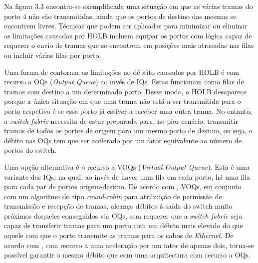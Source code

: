 Na figura 3.3 encontra-se exemplificada uma situação em que as várias tramas do porto 4 não são transmitidas, ainda que os portos de destino das mesmas se encontrem livres. Técnicas que podem ser aplicadas para minimizar ou eliminar as limitações causadas por HOLB incluem equipar os portos com lógica capaz de requerer o envio de tramas que se encontrem em posições mais atrasadas nas filas ou incluir várias filas por porto. \par
Uma forma de contornar as limitações no débtito causados por HOLB é com recurso a OQs (\textit{Output Queue}) ao invés de IQs. Estas funcionam como filas de tramas com destino a um determinado porto. Desse modo, o HOLB desaparece porque a única situação em que uma trama não está a ser transmitida para o porto respetivo é se esse porto já estiver a receber uma outra trama. No entanto, a \textit{switch fabric} necessita de estar preparada para, no pior cenário, transmitir tramas de todos os portos de origem para um mesmo porto de destino, ou seja, o débito nas OQs tem que ser acelerado por um fator equivalente ao número de portos do switch.\par 
Uma opção alternativa é o recurso a VOQs (\textit{Virtual Output Queue}). Esta é uma variante das IQs, na qual, ao invés de haver uma fila em cada porto, há uma fila para cada par de portos origem-destino. De acordo com \cite{VOQ}, VOQs, em conjunto com um algoritmo do tipo \textit{round-robin} para atribuição de permissão de transmissão e recepção de tramas, alcança débitos à saída do switch muito próximos daqueles conseguidos via OQs, sem requerer que a \textit{switch fabric} seja capaz de transferir tramas para um porto com um débito mais elevado do que aquele com que o porto transmite as tramas para os cabos de \textit{Ethernet}. De acordo com \cite{math}, com recurso a uma aceleração por um fator de apenas dois, torna-se possível garantir o mesmo débito que com uma arquitectura com recurso a OQs. \par

